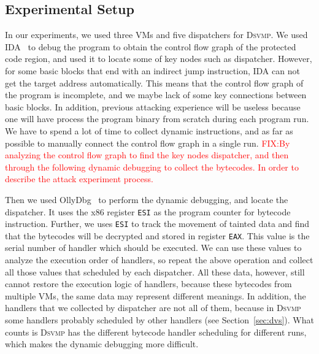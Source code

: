 \documentclass[conference]{IEEEtran}
\newcommand{\DSVMP}{\textsc{Dsvmp}\xspace}
\newcommand\FIXME[1]{\textcolor{red}{FIX:}\textcolor{red}{#1}}
\begin{document}
\subsection{Experimental Setup}
In our experiments, we used three VMs and five dispatchers for \DSVMP. We used IDA~\cite{14Idapro} to debug the program to obtain the control flow graph of the protected code region, and used it to locate some of key nodes such as dispatcher. 
However, for some basic blocks that end with an indirect jump instruction, IDA can not get the target address automatically. This means that the control flow graph of the program is incomplete, and we maybe lack of some key connections between basic blocks. In addition, previous attacking experience will be useless because one will have process the program binary from scratch during each program run. 
We have to spend a lot of time to collect dynamic instructions, and as far as possible to manually connect the control flow graph in a single run.
\FIXME{By analyzing the control flow graph to find the key nodes dispatcher, and then through the following dynamic debugging to collect the bytecodes. In order to describe the attack experiment process.}

Then we used OllyDbg~\cite{15Ollydbg} to perform the dynamic debugging, and locate the dispatcher. It uses the x86 register \texttt{ESI} as the program counter for bytecode instruction. Further, we uses \texttt{ESI} to track the movement of tainted data and find that the bytecodes will be decrypted and stored in register \texttt{EAX}. This value is the serial number of handler which should be executed. We can use these values to analyze the execution order of handlers, so repeat the above operation and collect all those values that scheduled by each dispatcher. All these data, however, still cannot restore the execution logic of handlers, because these bytecodes from multiple VMs, the same data may represent different meanings. In addition, the handlers that we collected by dispatcher are not all of them, because in \DSVMP some handlers probably scheduled by other handlers (see Section~\ref{sec:dvs}). What counts is \DSVMP has the different bytecode handler scheduling for different runs, which makes the dynamic debugging more difficult.
\end{document}
